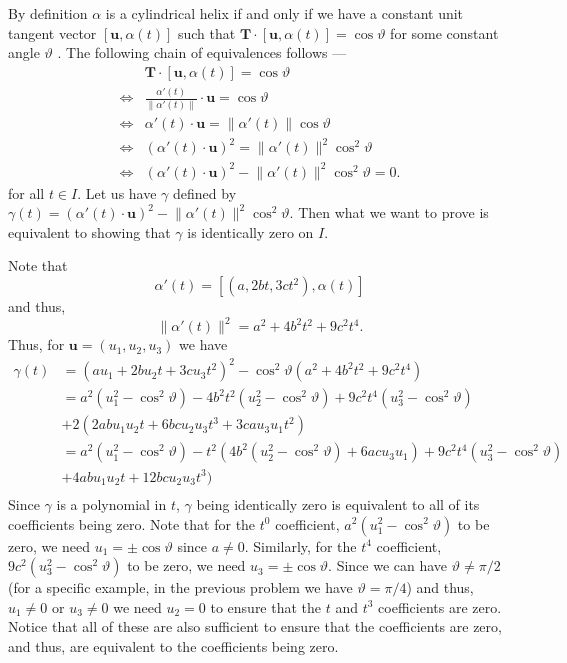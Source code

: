 \documentclass[12 pt, letterpaper]{hmcpset}
\begin{document}
\begin{solution}
	By definition $\alpha$  is a cylindrical helix if and only if we have a constant unit tangent vector $[\mathbf{u}, \alpha(t)]$  such that $\mathbf{T} \cdot [\mathbf{u}, \alpha(t)] = \cos{\vartheta}$ for some constant angle $\vartheta$ . The following chain of equivalences follows ---
	\[
		\begin{split}
			& \mathbf{T} \cdot [\mathbf{u}, \alpha(t)] = \cos{\vartheta} \\
			\iff & \frac{\alpha'(t)}{\lVert \alpha'(t) \rVert} \cdot \mathbf{u} = \cos{\vartheta} \\
			\iff & \alpha'(t) \cdot \mathbf{u} = \lVert \alpha'(t) \rVert \cos{\vartheta} \\
			\iff & (\alpha'(t) \cdot \mathbf{u})^{2} = \lVert \alpha'(t) \rVert^{2} \cos^{2}{\vartheta} \\
			\iff & (\alpha'(t) \cdot \mathbf{u})^{2} - \lVert \alpha'(t) \rVert^{2} \cos^{2}{\vartheta} = 0.
		\end{split}
	\]
	for all $t \in I$. Let us have $\gamma$ defined by $\gamma(t) = (\alpha'(t) \cdot \mathbf{u})^{2} - \lVert \alpha'(t) \rVert^{2} \cos^{2}{\vartheta}$. Then what we want to prove is equivalent to showing that $\gamma$ is identically zero on $I$. 

	Note that
	\[
		\alpha'(t) = [(a, 2b t, 3 c t^{2}), \alpha(t)]
	\]
	and thus,
	\[
		\lVert \alpha'(t) \rVert^{2} = a^{2} + 4b^{2} t^{2} + 9c^{2} t^{4}. 
	\]
	Thus, for $\mathbf{u} = (u_{1}, u_{2}, u_{3})$ we have
	\[
		\begin{split}
			\gamma(t) & = (a u_{1} + 2 b u_{2} t + 3 c u_{3} t^{2})^{2} - \cos^{2}{\vartheta}(a^{2} + 4b^{2} t^{2} + 9 c^{2} t^{4}) \\
				  & = a^{2}(u_{1}^{2} - \cos^{2}{\vartheta}) - 4b^{2}t^{2}(u_{2}^{2} - \cos^{2}{\vartheta}) + 9 c^{2} t^{4} (u_{3}^{2} - \cos^{2}{\vartheta}) \\ 
				  & + 2(2 ab u_{1} u_{2} t + 6 bc u_{2} u_{3} t^{3} + 3 ca u_{3} u_{1} t^{2}) \\
				  & = a^{2}(u_{1}^{2} - \cos^{2}{\vartheta}) - t^{2}(4 b^{2} (u_{2}^{2} - \cos^{2}{\vartheta}) + 6 ac u_{3} u_{1}) + 9 c^{2} t^{4} (u_{3}^{2} - \cos^{2}{\vartheta}) \\ 
				  & + 4 ab u_{1} u_{2} t + 12 bc u_{2} u_{3} t^{3}) \\
		\end{split}
	\]
	Since $\gamma$ is a polynomial in $t$, $\gamma$ being identically zero is equivalent to all of its coefficients being zero. Note that for the $t^{0}$ coefficient, $a^{2}(u_{1}^{2} - \cos^{2}{\vartheta})$ to be zero, we need $u_{1} = \pm \cos{\vartheta}$ since $a \neq 0$. Similarly, for the $t^{4}$ coefficient, $9c^{2}(u_{3}^{2} - \cos^{2}{\vartheta})$ to be zero, we need $u_{3} = \pm \cos{\vartheta}$. Since we can have $\vartheta \neq \pi/2$ (for a specific example, in the previous problem we have $\vartheta = \pi/4$) and thus, $u_{1} \neq 0$ or $u_{3} \neq 0$ we need $u_{2} = 0$ to ensure that the $t$ and $t^{3}$ coefficients are zero. Notice that all of these are also sufficient to ensure that the coefficients are zero, and thus, are equivalent to the coefficients being zero. 


\end{solution}
\end{document}
